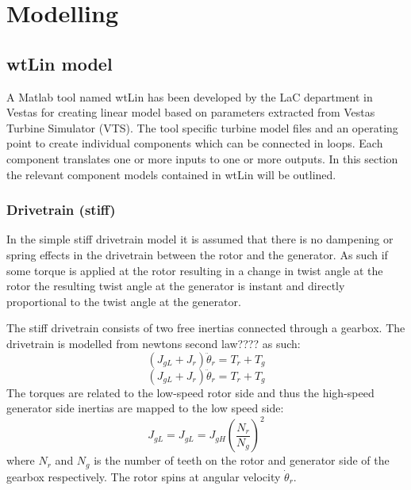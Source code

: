 \section{Modelling} \label{sec:mod} %

\subsection{wtLin model}
A Matlab tool named wtLin has been developed by the LaC department in Vestas for creating linear model based on parameters extracted from Vestas Turbine Simulator (VTS). The tool specific turbine model files and an operating point to create individual components which can be connected in loops. Each component translates one or more inputs to one or more outputs. In this section the relevant component models contained in wtLin will be outlined.\\

\subsubsection{Drivetrain (stiff)}
In the simple stiff drivetrain model it is assumed that there is no dampening or spring effects in the drivetrain between the rotor and the generator. As such if some torque is applied at the rotor resulting in a change in twist angle at the rotor the resulting twist angle at the generator is instant and directly proportional to the twist angle at the generator.

The stiff drivetrain consists of two free inertias connected through a gearbox. The drivetrain is modelled from newtons second law???? as such:
\begin{equation}\label{eq:wtlin_comp_drivetrain}
	(J_{gL} + J_{r}) \ddot{\theta}_r = T_{r} + T_{g}
\end{equation}
\begin{equation}\label{eq:wtlin_comp_drivetrain}
	(J_{gL} + J_{r}) \ddot{\theta}_r = T_{r} + T_{g}
\end{equation}
The torques are related to the low-speed rotor side and thus the high-speed generator side inertias are mapped to the low speed side:
\begin{equation} \label{eq:wtlin_comp_inertiamap}
	J_{gL} = J_{gL} = J_{gH} \left(\dfrac{N_r}{N_g}\right)^2
\end{equation}
where $ N_r $ and $ N_g $ is the number of teeth on the rotor and generator side of the gearbox respectively. The rotor spins at angular velocity $ \dot{\theta}_r $.


